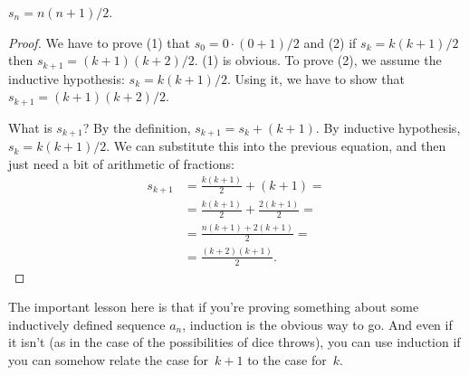 \documentclass[../../../include/open-logic-section]{subfiles}
\begin{document}
\begin{prop}
  $s_n = n(n+1)/2$.
\end{prop}

\begin{proof}
  We have to prove (1) that $s_0 = 0\cdot(0 + 1)/2$ and (2) if $s_k =
  k(k+1)/2$ then $s_{k+1} = (k+1)(k+2)/2$.  (1) is obvious. To prove
  (2), we assume the inductive hypothesis: $s_k = k(k+1)/2$. Using it,
  we have to show that $s_{k+1} = (k+1)(k+2)/2$.

  What is $s_{k+1}$?  By the definition, $s_{k+1} = s_k + (k+1)$.  By
  inductive hypothesis, $s_k = k(k+1)/2$. We can substitute this into
  the previous equation, and then just need a bit of arithmetic of
  fractions:
  \begin{align*}
    s_{k+1} & = \frac{k(k+1)}{2} + (k+1) = {}\\
    & = \frac{k(k+1)}{2} + \frac{2(k+1)}{2} = {}\\
    & = \frac{n(k+1) + 2(k+1)}{2} = {}\\
    & = \frac{(k+2)(k+1)}{2}.
  \end{align*}
\end{proof}

The important lesson here is that if you're proving something about
some inductively defined sequence $a_n$, induction is the obvious way
to go. And even if it isn't (as in the case of the possibilities of
dice throws), you can use induction if you can somehow relate the case
for~$k+1$ to the case for~$k$.
\end{document}

